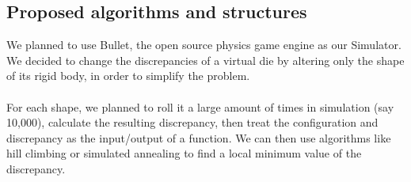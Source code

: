 \subsection{Proposed algorithms and structures}
We planned to use Bullet, the open source physics game engine as our Simulator. We decided to change the discrepancies of a virtual die by altering only the shape of its rigid body, in order to simplify the problem.\\\\
For each shape, we planned to roll it a large amount of times in simulation (say 10,000), calculate the resulting discrepancy, then treat the configuration and discrepancy as the input/output of a function. We can then use algorithms like hill climbing or simulated annealing to find a local minimum value of the discrepancy.